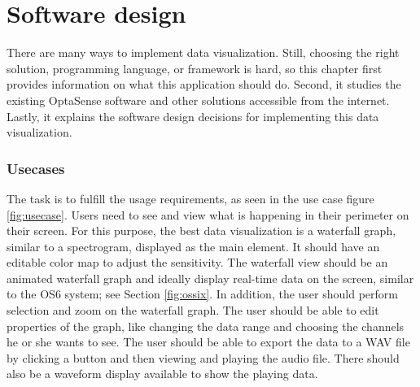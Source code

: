 
\chapter{Software design}\label{txt.design.design}

There are many ways to implement data visualization. Still, choosing the right solution, programming language, or framework is hard, so this chapter first provides information on what this application should do. Second, it studies the existing OptaSense software and other solutions accessible from the internet. Lastly, it explains the software design decisions for implementing this data visualization.

\subsection{Usecases}\label{lab:usecases}\label{txt.design.sw.usecase}

The task is to fulfill the usage requirements, as seen in the use case figure \ref{fig:usecase}. Users need to see and view what is happening in their perimeter on their screen. For this purpose, the best data visualization is a waterfall graph, similar to a spectrogram, displayed as the main element. It should have an editable color map to adjust the sensitivity. The waterfall view should be an animated waterfall graph and ideally display real-time data on the screen, similar to the OS6 system; see Section \ref{fig:ossix}. In addition, the user should perform selection and zoom on the waterfall graph. The user should be able to edit properties of the graph, like changing the data range and choosing the channels he or she wants to see. The user should be able to export the data to a WAV file by clicking a button and then viewing and playing the audio file. There should also be a waveform display available to show the playing data.

